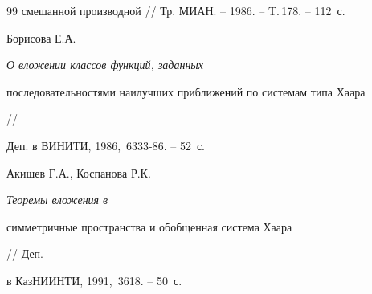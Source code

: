 \begin{thebibliography}{99}
{смешанной производной} // Тр. МИАН. -- 1986. -- T.\,178. -- 112~с.




Борисова Е.А. {\em О вложении классов функций, заданных 


последовательностями наилучших приближений по системам типа Хаара} // 


Деп. в ВИНИТИ, 1986, \No\,6333-86. -- 52~с.




Акишев Г.А., Коспанова Р.К. {\em Теоремы вложения в 


симметричные пространства и обобщенная система Хаара} // Деп.


в КазНИИНТИ, 1991, \No\,3618. -- 50~с.





\end{thebibliography}





\vskip 2cm














\label{end}





